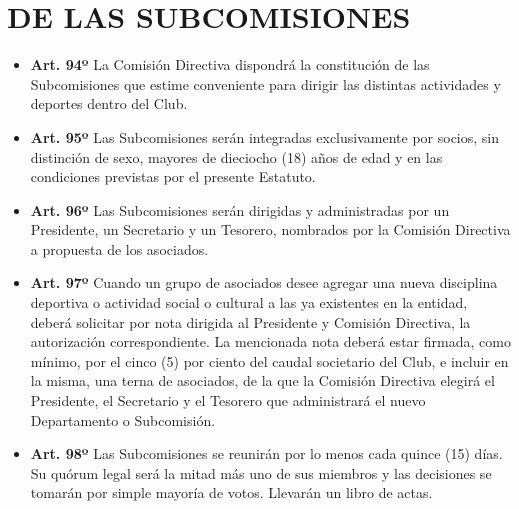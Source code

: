 \documentclass[openany]{book}
\providecommand{\tightlist}{%
  \setlength{\itemsep}{0pt}\setlength{\parskip}{0pt}}
\begin{document}
\hypertarget{cap20}{%
\chapter{DE LAS SUBCOMISIONES}\label{cap20}}

\begin{itemize}
\tightlist
\item
  \textbf{Art. 94º}
  La Comisión Directiva dispondrá la constitución de las Subcomisiones que estime conveniente para dirigir las distintas actividades y deportes dentro del Club.
\end{itemize}

\begin{itemize}
\tightlist
\item
  \textbf{Art. 95º}
  Las Subcomisiones serán integradas exclusivamente por socios, sin distinción de sexo, mayores de dieciocho (18) años de edad y en las condiciones previstas por el presente Estatuto.
\end{itemize}

\begin{itemize}
\tightlist
\item
  \textbf{Art. 96º}
  Las Subcomisiones serán dirigidas y administradas por un Presidente, un Secretario y un Tesorero, nombrados por la Comisión Directiva a propuesta de los asociados.
\end{itemize}

\begin{itemize}
\tightlist
\item
  \textbf{Art. 97º}
  Cuando un grupo de asociados desee agregar una nueva disciplina deportiva o actividad social o cultural a las ya existentes en la entidad, deberá solicitar por nota dirigida al Presidente y Comisión Directiva, la autorización correspondiente. La mencionada nota deberá estar firmada, como mínimo, por el cinco (5) por ciento del caudal societario del Club, e incluir en la misma, una terna de asociados, de la que la Comisión Directiva elegirá el Presidente, el Secretario y el Tesorero que administrará el nuevo Departamento o Subcomisión.
\end{itemize}

\begin{itemize}
\tightlist
\item
  \textbf{Art. 98º}
  Las Subcomisiones se reunirán por lo menos cada quince (15) días. Su quórum legal será la mitad más uno de sus miembros y las decisiones se tomarán por simple mayoría de votos. Llevarán un libro de actas.
\end{itemize}
\end{document}

